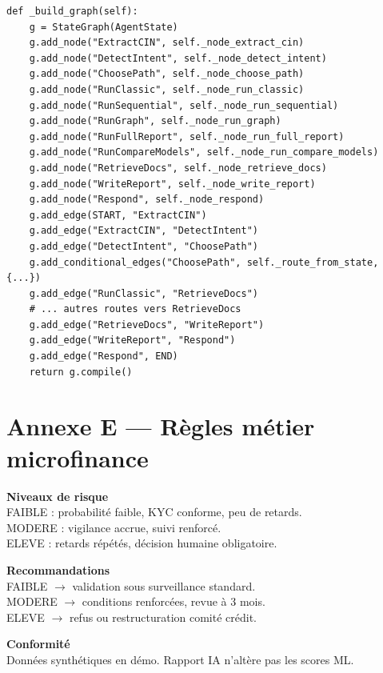\begin{lstlisting}[caption={Extrait CreditAgentOrchestrator — construction graphe},label={lst:orch}]
def _build_graph(self):
    g = StateGraph(AgentState)
    g.add_node("ExtractCIN", self._node_extract_cin)
    g.add_node("DetectIntent", self._node_detect_intent)
    g.add_node("ChoosePath", self._node_choose_path)
    g.add_node("RunClassic", self._node_run_classic)
    g.add_node("RunSequential", self._node_run_sequential)
    g.add_node("RunGraph", self._node_run_graph)
    g.add_node("RunFullReport", self._node_run_full_report)
    g.add_node("RunCompareModels", self._node_run_compare_models)
    g.add_node("RetrieveDocs", self._node_retrieve_docs)
    g.add_node("WriteReport", self._node_write_report)
    g.add_node("Respond", self._node_respond)
    g.add_edge(START, "ExtractCIN")
    g.add_edge("ExtractCIN", "DetectIntent")
    g.add_edge("DetectIntent", "ChoosePath")
    g.add_conditional_edges("ChoosePath", self._route_from_state, {...})
    g.add_edge("RunClassic", "RetrieveDocs")
    # ... autres routes vers RetrieveDocs
    g.add_edge("RetrieveDocs", "WriteReport")
    g.add_edge("WriteReport", "Respond")
    g.add_edge("Respond", END)
    return g.compile()
\end{lstlisting}

\chapter{Annexe E — Règles métier microfinance}
\label{ann:regles}

\begin{tcolorbox}[colback=codebg,colframe=codeframe,breakable]
\textbf{Niveaux de risque}\\
FAIBLE : probabilité faible, KYC conforme, peu de retards.\\
MODERE : vigilance accrue, suivi renforcé.\\
ELEVE : retards répétés, décision humaine obligatoire.

\textbf{Recommandations}\\
FAIBLE $\rightarrow$ validation sous surveillance standard.\\
MODERE $\rightarrow$ conditions renforcées, revue à 3 mois.\\
ELEVE $\rightarrow$ refus ou restructuration comité crédit.

\textbf{Conformité}\\
Données synthétiques en démo. Rapport IA n'altère pas les scores ML.
\end{tcolorbox}

